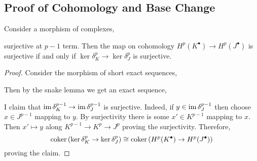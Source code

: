 \documentclass[12pt]{article}
\begin{document}
\subsection{Proof of Cohomology and Base Change} 

\begin{lemma}
Consider a morphism of complexes,
\begin{center}
\end{center}
surjective at $p-1$ term. Then the map on cohomology $H^p(K^\bullet) \to H^p(J^\bullet)$ is surjective if and only if $\ker{\delta_K^p} \to \ker{\delta_J^p}$ is surjective.
\end{lemma}

\begin{proof}
Consider the morphism of short exact sequences,
\begin{center}
\end{center}
Then by the snake lemma we get an exact sequence,
\begin{center}
\end{center}
I claim that $\operatorname{\mathrm{im}}{\delta_K^{p-1}} \to \operatorname{\mathrm{im}}{\delta_J^{p-1}}$ is surjective. Indeed, if $y \in \operatorname{\mathrm{im}}{\delta_J^{p-1}}$ then choose $x \in J^{p-1}$ mapping to $y$.  By surjectivity there is some $x' \in K^{p-1}$ mapping to $x$. Then $x' \mapsto y$ along $K^{p-1} \to K^p \to J^p$ proving the surjectivity. Therefore,
\[ \operatorname{\mathrm{coker}}{(\ker{\delta_K^p} \to \ker{\delta_J^p})} \cong \operatorname{\mathrm{coker}}{(H^p(K^\bullet) \to H^p(J^\bullet))} \]
proving the claim.
\end{proof}
\end{document}
